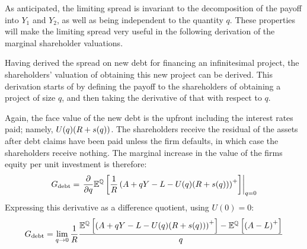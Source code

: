 \documentclass[../main.tex]{subfiles}
\begin{document}
        As anticipated, the limiting spread is invariant to the decomposition of the payoff into $Y_{1}$ and $Y_{2}$,
        as well as being independent to the quantity $q$. 
        These properties will make the limiting spread very useful in the following derivation
        of the marginal shareholder valuations.

        Having derived the spread on new debt for financing an infinitesimal project,
        the shareholders' valuation of obtaining this new project can be derived.
        This derivation starts of by defining the payoff to the shareholders 
        of obtaining a project of size $q$,
        and then taking the derivative of that with respect to $q$.
        
        Again, the face value of the new debt is the upfront including the interest rates paid;
        namely, $U(q)(R + s(q))$. 
        The shareholders receive the residual of the assets after debt claims have been paid
        unless the firm defaults, in which case the shareholders receive nothing. 
        The marginal increase in the value of the firms equity per unit investment is therefore:
            \begin{equation*}
                G_{\text{debt}} 
                = 
                \left.
                \frac{
                    \partial 
                }{
                    \partial 
                    q
                }
                \mathbb{E}^{\mathbb{Q}}\left[
                    \frac{1}{R} 
                    \left(
                        A + qY - L - U(q)(R + s(q))
                    \right)^{+}
                \right] 
                \right\rvert_{q=0} 
            \end{equation*}
        Expressing this derivative as a difference quotient, using $U(0)=0$:
            \begin{equation*}
                G_{\text{debt}} 
                =
                \lim_{q\rightarrow0} 
                \frac{1}{R}
                \frac{
                    \mathbb{E}^{\mathbb{Q}}\left[ 
                    \left(
                        A + qY - L - U(q)(R + s(q))
                    \right)^{+}
                    \right]
                    -
                    \mathbb{E}^{\mathbb{Q}}\left[ 
                    \left(
                        A - L
                    \right)^{+}
                \right] 
                }{
                    q
                } 
            \end{equation*}
\end{document}
